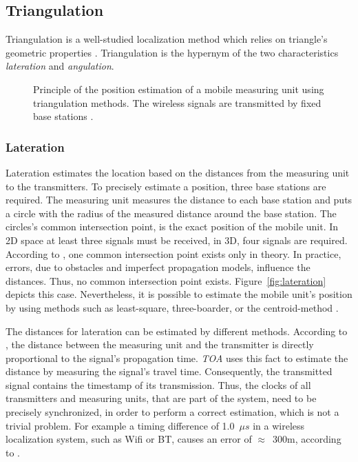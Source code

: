 \subsection{Triangulation}\label{sec:fund_trilateration}
Triangulation is a well-studied localization method which relies on triangle's geometric properties \citep{IEEE:survey_wireless_indoor_pos, wang:bt_pos}. Triangulation is the hypernym of the two characteristics \emph{lateration} and \emph{angulation}.

\begin{figure}[width=0.9\textwidth, height=0.4\textheight]
	
	\caption {Principle of the position estimation of a mobile measuring unit using triangulation methods. The wireless signals are transmitted by fixed base stations \citep{wang:bt_pos}.}
	\label{fig:triangulation}
\end{figure}

\subsubsection*{Lateration}
Lateration estimates the location based on the distances from the measuring unit to the transmitters. To precisely estimate a position, three base stations are required. The measuring unit measures the distance to each base station and puts a circle with the radius of the measured distance around the base station. The circles's common intersection point, is the exact position of the mobile unit. In 2D space at least three signals must be received, in 3D, four signals are required. According to \citet{wang:bt_pos}, one common intersection point exists only in theory. In practice, errors, due to obstacles and imperfect propagation models, influence the distances. Thus, no common intersection point exists. Figure~\ref{fig:lateration} depicts this case. Nevertheless, it is possible to estimate the mobile unit's position by using methods such as least-square, three-boarder, or the centroid-method \citep{wang:bt_pos, IEEE:survey_wireless_indoor_pos}.  

The distances for lateration can be estimated by different methods. According to \citet{IEEE:survey_wireless_indoor_pos}, the distance between the measuring unit and the transmitter is directly proportional to the signal's propagation time.
\emph{\ac{TOA}} uses this fact to estimate the distance by measuring the signal's travel time. Consequently, the transmitted signal contains the timestamp of its transmission. Thus, the clocks of all transmitters and measuring units, that are part of the system, need to be precisely synchronized, in order to perform a correct estimation, which is not a trivial problem. For example a timing difference of 1.0~$\mu s$ in a wireless localization system, such as Wifi or \ac{BT}, causes an error of $\approx$~300m, according to \citet{kotanen:exp_local_pos_bt}.

